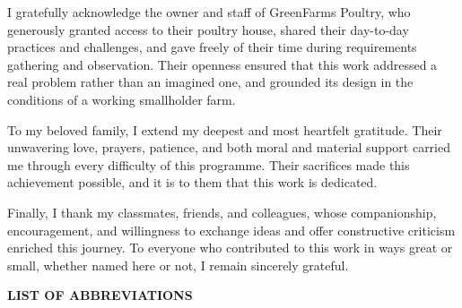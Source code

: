 \documentclass[12pt,a4paper]{report}
\begin{document}
I gratefully acknowledge the owner and staff of GreenFarms Poultry, who generously granted access to their poultry house, shared their day-to-day practices and challenges, and gave freely of their time during requirements gathering and observation. Their openness ensured that this work addressed a real problem rather than an imagined one, and grounded its design in the conditions of a working smallholder farm.

To my beloved family, I extend my deepest and most heartfelt gratitude. Their unwavering love, prayers, patience, and both moral and material support carried me through every difficulty of this programme. Their sacrifices made this achievement possible, and it is to them that this work is dedicated.

Finally, I thank my classmates, friends, and colleagues, whose companionship, encouragement, and willingness to exchange ideas and offer constructive criticism enriched this journey. To everyone who contributed to this work in ways great or small, whether named here or not, I remain sincerely grateful.

\clearpage
\tableofcontents

\clearpage
\listoftables

\clearpage
\listoffigures

\clearpage
\begin{center}
{\Large\bfseries LIST OF ABBREVIATIONS}
\end{center}
\vspace{1cm}
\end{document}
